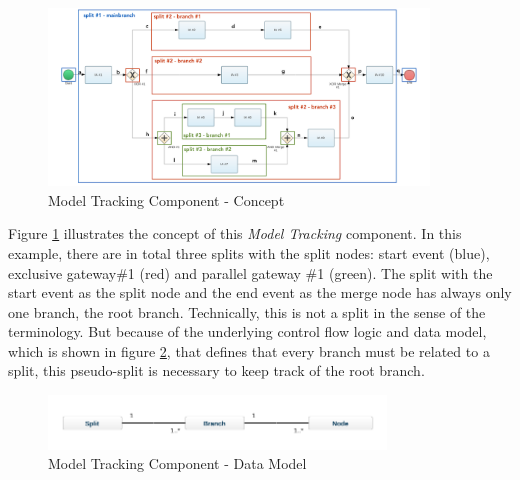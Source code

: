 \begin{figure}[htb]
\centering
\includegraphics[width=0.9\textwidth]{src/images/graphTracking_1_edges.png}
\caption{Model Tracking Component - Concept}
\label{fig:graphTracking1}
\end{figure}

Figure \ref{fig:graphTracking1} illustrates the concept of this \textit{Model Tracking} component. In this example, there are in total three splits with the split nodes: start event (blue), exclusive gateway\#1 (red) and parallel gateway \#1 (green). The split with the start event as the split node and the end event as the merge node has always only one branch, the root branch. Technically, this is not a split in the sense of the terminology. But because of the underlying control flow logic and data model, which is shown in figure \ref{fig:graphTracking2}, that defines that every branch must be related to a split, this pseudo-split is necessary to keep track of the root branch.

\begin{figure}[htb]
\centering
\includegraphics[width=0.8\textwidth]{src/images/graphtracking_dm.png}
\caption{Model Tracking Component - Data Model}
\label{fig:graphTracking2}
\end{figure}

